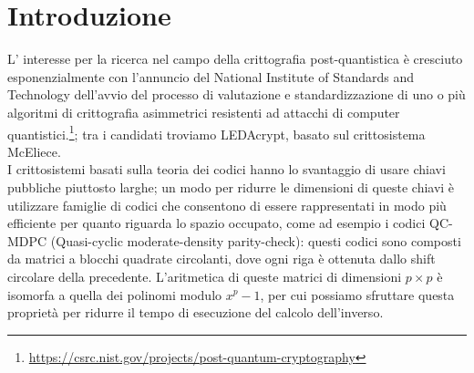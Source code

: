 \section{Introduzione}
L' interesse per la ricerca nel campo della crittografia post-quantistica è cresciuto esponenzialmente
con l'annuncio del National Institute of Standards and Technology dell'avvio del processo di valutazione
e standardizzazione di uno o più algoritmi di crittografia asimmetrici resistenti ad attacchi di computer 
quantistici.\footnote{\href{https://csrc.nist.gov/projects/post-quantum-cryptography}{https://csrc.nist.gov/projects/post-quantum-cryptography}};
tra i candidati troviamo LEDAcrypt\cite{baldi2019ledacrypt, ledaKEM}, basato sul crittosistema McEliece.\\
I crittosistemi basati sulla teoria dei codici hanno lo svantaggio di usare chiavi pubbliche piuttosto larghe; un modo per ridurre le dimensioni
di queste chiavi è utilizzare famiglie di codici che consentono di essere rappresentati in modo più efficiente per quanto riguarda lo spazio occupato,
come ad esempio i codici QC-MDPC (Quasi-cyclic moderate-density parity-check): questi codici sono composti da matrici a blocchi quadrate circolanti,
dove ogni riga è ottenuta dallo shift circolare della precedente. L'aritmetica di queste matrici di dimensioni $p \times p$ è isomorfa a quella dei polinomi modulo
$x^p-1$, per cui possiamo sfruttare questa proprietà per ridurre il tempo di esecuzione del calcolo dell'inverso.
